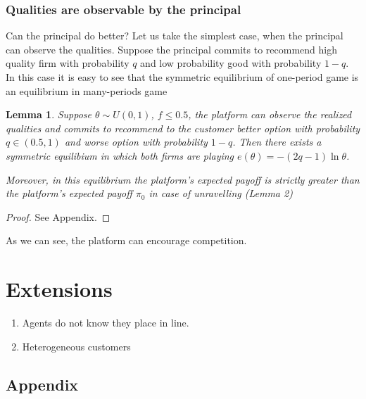 \documentclass[a4paper]{article}
\newtheorem{lemma}[theorem]{Lemma}
\begin{document}
\subsubsection{Qualities are observable by the principal}
Can the principal do better? Let us take the simplest case, when the principal can observe the qualities.
Suppose the principal commits to recommend high quality firm with probability $q$ and low probability good with probability $1-q$. In this case it is easy to see that the symmetric equilibrium of one-period game is an equilibrium in many-periods game
\begin{lemma}
	Suppose $\theta \sim U(0, 1)$, $f \le 0.5$, the platform can observe the realized qualities and commits to recommend to the customer better option with probability $q \in (0.5, 1)$ and worse option with probability $1-q$. Then there exists a symmetric equilibium in which both firms are playing $e(\theta) = -(2q - 1)\ln \theta$.
	
	
	
	Moreover, in this equilibrium the platform's expected payoff is strictly greater than the platform's expected payoff $\pi_0$ in case of unravelling (Lemma 2) 
\end{lemma}
\begin{proof}
	See Appendix.
\end{proof}

As we can see, the platform can encourage competition.

\section{Extensions}
\begin{enumerate}
	\item Agents do not know they place in line.
	\item Heterogeneous customers
\end{enumerate}
\subsection*{Appendix}
\end{document}
